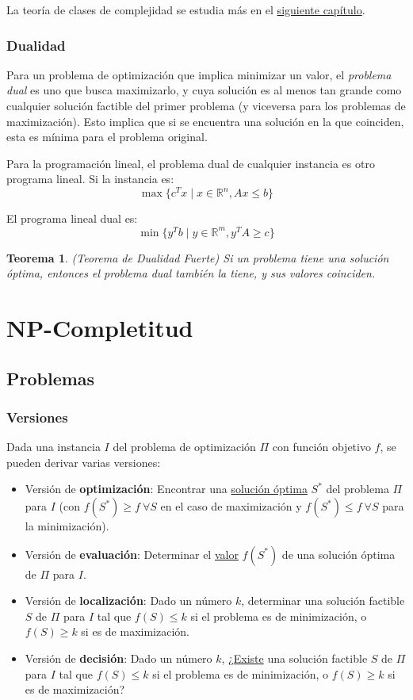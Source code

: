 \documentclass[a4paper]{report}
\newcommand{\R}{\mathbb{R}}
\newtheorem*{theorem*}{Teorema}
\begin{document}
La teoría de clases de complejidad se estudia más en el \hyperref[capitulo-np-completitud]{siguiente capítulo}.

\subsection{Dualidad}

Para un problema de optimización que implica minimizar un valor, el \textit{problema dual} es uno que busca maximizarlo, y cuya solución es al menos tan grande como cualquier solución factible del primer problema (y viceversa para los problemas de maximización). Esto implica que si se encuentra una solución en la que coinciden, esta es mínima para el problema original.

Para la programación lineal, el problema dual de cualquier instancia es otro programa lineal. Si la instancia es:
    $$\max{\{c^T x \mid x \in \R^n, Ax \leq b\}}$$

El programa lineal dual es:
    $$\min{\{y^T b \mid y \in \R^m, y^T A \geq c\}}$$

\begin{theorem*}
    (Teorema de Dualidad Fuerte) Si un problema tiene una solución óptima, entonces el problema dual también la tiene, y sus valores coinciden.
\end{theorem*}

\chapter{NP-Completitud}
\label{capitulo-np-completitud}

\section{Problemas}

\subsection{Versiones}

Dada una instancia $I$ del problema de optimización $\Pi$ con función objetivo $f$, se pueden derivar varias versiones:
\begin{itemize}
    \item Versión de \textbf{optimización}: Encontrar una \underline{solución óptima} $S^*$ del problema $\Pi$ para $I$ (con $f(S^*) \geq f\ \forall S$ en el caso de maximización y $f(S^*) \le f\ \forall S$ para la minimización).
    \item Versión de \textbf{evaluación}: Determinar el \underline{valor} $f(S^*)$ de una solución óptima de $\Pi$ para $I$.
    \item Versión de \textbf{localización}: Dado un número $k$, determinar una solución factible $S$ de $\Pi$ para $I$ tal que \underline{$f(S) \leq k$} si el problema es de minimización, o $f(S) \geq k$ si es de maximización.
    \item Versión de \textbf{decisión}: Dado un número $k$, ¿\underline{Existe} una solución factible $S$ de $\Pi$ para $I$ tal que $f(S) \leq k$ si el problema es de minimización, o $f(S) \geq k$ si es de maximización?
\end{itemize}
\end{document}

